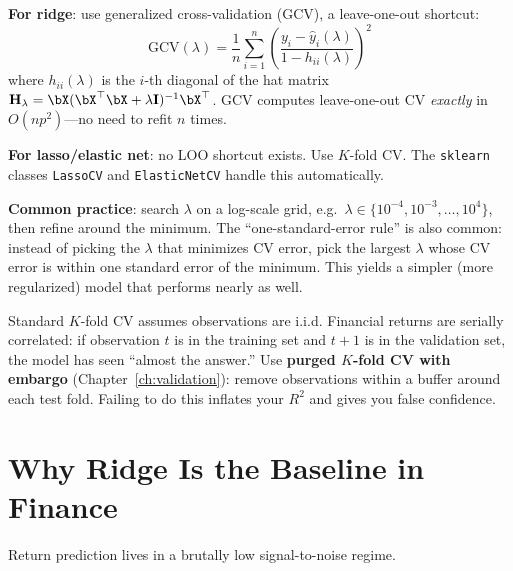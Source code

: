 \textbf{For ridge}: use generalized cross-validation (GCV), a leave-one-out shortcut:
\begin{equation}
\mathrm{GCV}(\lambda) = \frac{1}{n} \sum_{i=1}^n \left( \frac{y_i - \hat{y}_i(\lambda)}{1 - h_{ii}(\lambda)} \right)^2
\label{eq:gcv}
\end{equation}
where $h_{ii}(\lambda)$ is the $i$-th diagonal of the hat matrix $\mathbf{H}_\lambda = \bX(\bX^\top\bX + \lambda\mathbf{I})^{-1}\bX^\top$.
GCV computes leave-one-out CV \emph{exactly} in $O(np^2)$---no need to refit $n$ times.

\textbf{For lasso/elastic net}: no LOO shortcut exists. Use $K$-fold CV. The \texttt{sklearn} classes \texttt{LassoCV} and \texttt{ElasticNetCV} handle this automatically.

\textbf{Common practice}: search $\lambda$ on a log-scale grid, e.g.\ $\lambda \in \{10^{-4}, 10^{-3}, \ldots, 10^{4}\}$, then refine around the minimum.
The ``one-standard-error rule'' is also common: instead of picking the $\lambda$ that minimizes CV error, pick the largest $\lambda$ whose CV error is within one standard error of the minimum.
This yields a simpler (more regularized) model that performs nearly as well.

\begin{warning}
Standard $K$-fold CV assumes observations are i.i.d.
Financial returns are serially correlated: if observation $t$ is in the training set and $t{+}1$ is in the validation set, the model has seen ``almost the answer.''
Use \textbf{purged $K$-fold CV with embargo} (Chapter~\ref{ch:validation}): remove observations within a buffer around each test fold.
Failing to do this inflates your $R^2$ and gives you false confidence.
\end{warning}

\section{Why Ridge Is the Baseline in Finance}
\label{sec:ridge-baseline}

Return prediction lives in a brutally low signal-to-noise regime.

